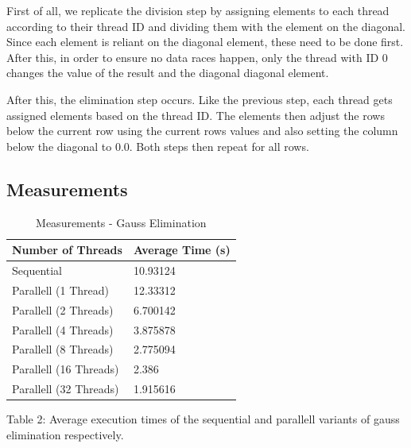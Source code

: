 \documentclass[a4]{article}
\begin{document}
First of all, we replicate the division step by assigning elements to each thread according to their thread ID and dividing
them with the element on the diagonal. Since each element is reliant on the diagonal element, these need to be done first.
After this, in order to ensure no data races happen, only the thread with ID 0 changes the value of the result and the diagonal
diagonal element.

After this, the elimination step occurs. Like the previous step, each thread gets assigned elements based on the thread ID.
The elements then adjust the rows below the current row using the current rows values and also setting the column below the
diagonal to 0.0. Both steps then repeat for all rows.

\subsection{Measurements}

\begin{table}[H]
	\caption{Measurements - Gauss Elimination}
	\begin{center}
		\begin{tabular}{ | m{10em} | m{8em} |} 
			\hline
			Number of Threads & Average Time (s) \\
			\hline
			\hline
			Sequential & 10.93124 \\
			\hline
			\hline
			Parallell (1 Thread) & 12.33312 \\
			Parallell (2 Threads) & 6.700142 \\
			Parallell (4 Threads) & 3.875878\\
			Parallell (8 Threads) & 2.775094 \\
			Parallell (16 Threads) & 2.386 \\
			Parallell (32 Threads) & 1.915616 \\
			\hline
		\end{tabular}
	\end{center}
	\begin{tablenotes}
		\small
		\item Table 2: Average execution times of the sequential and parallell variants of gauss elimination respectively. 
	\end{tablenotes}
\end{table}
\end{document}
